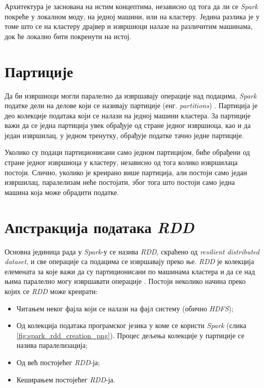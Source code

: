 \documentclass[12pt,oneside]{memoir}
\begin{document}
Архитектура је заснована на истим концептима, независно од тога да ли се \textit{Spark} покреће у локалном моду, на једној машини, или на кластеру. Једина разлика је у томе што се на кластеру драјвер и извршиоци налазе на различитим машинама, док ће локално бити покренути на истој.

\section{Партиције}
\label{sec:spark_partic}

Да би извршиоци могли паралелно да извршавају операције над подацима, \textit{Spark} податке дели на делове који се називају партиције (енг. \textit{partitions}) \cite{spark_guide}. Партиција је део колекције података који се налази на једној машини кластера. За партиције важи да се једна партиција увек обрађује од стране једног извршиоца, као и да један извршилац, у једном тренутку, обрађује податке тачно једне партиције.



Уколико су подаци партиционисани само једном партицијом, биће обрађени од стране једног извршиоца у кластеру, независно од тога колико извршилаца постоји. Слично, уколико је креирано више партиција, али постоји само један извршилац, паралелизам неће постојати, због тога што постоји само једна машина која може обрадити податке.

\section{Апстракција података \textit{RDD}}
\label{sec:spark_rdd}

Основна јединица рада у \textit{Spark}-у се назива \textit{RDD}, скраћено од \textit{resilient distributed dataset}, и све операције са подацима се извршавају преко ње. \textit{RDD} је колекција елемената за које важи да су партиционисани по машинама кластера и да се над њима паралелно могу извршавати операције \cite{spark_rdd}. Постоји неколико начина преко којих се \textit{RDD} може креирати:
\begin{itemize}
\item Читањем неког фајла који се налази на фајл систему (обично \textit{HDFS});
\item Од колекција података програмског језика у коме се користи \textit{Spark} (слика \ref{fig:spark_rdd_creation_png}). Процес дељења колекције у партиције се назива паралелизација;
\item Од већ постојећег \textit{RDD}-ја;
\item Кеширањем постојећег \textit{RDD}-ја.
\end{itemize}
\end{document}
